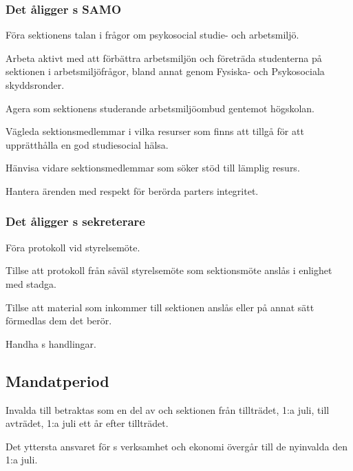 \subsubsection{Det åligger \STYRIT{}s SAMO}
\begin{att}
    \item Föra sektionens talan i frågor om psykosocial studie- och arbetsmiljö.
    \item Arbeta aktivt med att förbättra arbetsmiljön och företräda studenterna på sektionen i arbetsmiljöfrågor, bland annat genom Fysiska- och Psykosociala skyddsronder.
    \item Agera som sektionens studerande arbetsmiljöombud gentemot högskolan.
    \item Vägleda sektionsmedlemmar i vilka resurser som finns att tillgå för att upprätthålla en god studiesocial hälsa.
    \item Hänvisa vidare sektionsmedlemmar som söker stöd till lämplig resurs.
    \item Hantera ärenden med respekt för berörda parters integritet.
\end{att}
 
\subsubsection{Det åligger \STYRIT{}s sekreterare}
\begin{att}
	\item Föra protokoll vid styrelsemöte.
	\item Tillse att protokoll från såväl styrelsemöte som sektionsmöte anslås i enlighet med stadga.
	\item Tillse att material som inkommer till sektionen anslås eller på annat sätt förmedlas dem det berör.
	\item Handha \STYRIT{}s handlingar.
\end{att}

\subsection{Mandatperiod}
Invalda till \STYRIT{} betraktas som en del av \STYRIT{} och sektionen från tillträdet, 1:a juli, till avträdet, 1:a juli ett år efter tillträdet.

Det yttersta ansvaret för \STYRIT{}s verksamhet och ekonomi övergår till de nyinvalda den 1:a juli.
